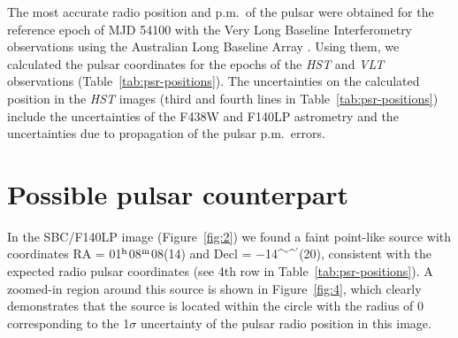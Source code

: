 \documentclass[pdftex,twocolumn]{aastex62}
\def\degs{\ifmmode ^{\circ}\else$^{\circ}$\fi}
\def\amin{\ifmmode ^{\prime}\else$^{\prime}$\fi}
\def\asec{\ifmmode ^{\prime\prime}\else$^{\prime\prime}$\fi}
\def\h{$^{\rm h}$}
\def\m{$^{\rm m}$}
\begin{document}

The most accurate  radio  position and p.m.\ of the pulsar were obtained for the reference epoch of MJD 54100  
with the Very Long Baseline Interferometry  observations  using the Australian Long Baseline Array 
\citep{Deller2009}.  Using them, we calculated the pulsar coordinates 
for the epochs of the {\sl HST} and {\sl VLT} observations 
(Table~\ref{tab:psr-positions}).
The uncertainties on the calculated position in the {\sl HST} images 
(third and fourth lines in 
Table~\ref{tab:psr-positions}) include the uncertainties of the 
F438W and F140LP astrometry   
and the uncertainties 
due to propagation of the pulsar p.m.\ errors. 


\section{Possible pulsar counterpart}
In the SBC/F140LP image (Figure~\ref{fig:2})   
we found a faint point-like source with coordinates  
RA = 01\h08\m08(14) and  
Decl = $-$14\degs31\amin51(20),    
 consistent with the expected  radio pulsar  
coordinates (see 4th row in Table~\ref{tab:psr-positions}).
A zoomed-in region around this source is shown in  Figure~\ref{fig:4}, which 
clearly demonstrates  that  the source is located 
within the circle  with the radius 
of 0 corresponding to the 1$\sigma$ uncertainty of the pulsar radio position in this image. 
\end{document}
